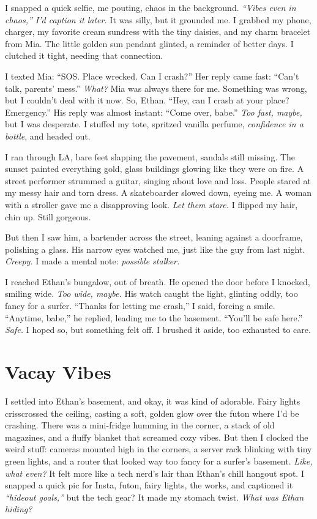 \documentclass[12pt]{article}
\begin{document}
{I snapped a quick selfie, me pouting, chaos in the background. \textit{“Vibes even in chaos,” I’d caption it later.} It was silly, but it grounded me. I grabbed my phone, charger, my favorite cream sundress with the tiny daisies, and my charm bracelet from \textnormal{Mia}. The little golden sun pendant glinted, a reminder of better days. I clutched it tight, needing that connection.

I texted \textnormal{Mia}: “SOS. Place wrecked. Can I crash?” Her reply came fast: “Can’t talk, parents’ mess.” \textit{What?} \textnormal{Mia} was always there for me. Something was wrong, but I couldn’t deal with it now. So, \textnormal{Ethan}. “Hey, can I crash at your place? Emergency.” His reply was almost instant: “Come over, babe.” \textit{Too fast, maybe,} but I was desperate. I stuffed my tote, spritzed vanilla perfume, \textit{confidence in a bottle}, and headed out.

I ran through LA, bare feet slapping the pavement, sandals still missing. The sunset painted everything gold, glass buildings glowing like they were on fire. A street performer strummed a guitar, singing about love and loss. People stared at my messy hair and torn dress. A skateboarder slowed down, eyeing me. A woman with a stroller gave me a disapproving look. \textit{Let them stare.} I flipped my hair, chin up. Still gorgeous.

But then I saw him, a bartender across the street, leaning against a doorframe, polishing a glass. His narrow eyes watched me, just like the guy from last night. \textit{Creepy.} I made a mental note: \textit{possible stalker.}

I reached \textnormal{Ethan}’s bungalow, out of breath. He opened the door before I knocked, smiling wide. \textit{Too wide, maybe.} His watch caught the light, glinting oddly, too fancy for a surfer. “Thanks for letting me crash,” I said, forcing a smile. “Anytime, babe,” he replied, leading me to the basement. “You’ll be safe here.” \textit{Safe.} I hoped so, but something felt off. I brushed it aside, too exhausted to care.

\section{Vacay Vibes}

I settled into \textnormal{Ethan}’s basement, and okay, it was kind of adorable. Fairy lights crisscrossed the ceiling, casting a soft, golden glow over the futon where I’d be crashing. There was a mini-fridge humming in the corner, a stack of old magazines, and a fluffy blanket that screamed cozy vibes. But then I clocked the weird stuff: cameras mounted high in the corners, a server rack blinking with tiny green lights, and a router that looked way too fancy for a surfer’s basement. \textit{Like, what even?} It felt more like a tech nerd’s lair than \textnormal{Ethan}’s chill hangout spot. I snapped a quick pic for Insta, futon, fairy lights, the works, and captioned it \textit{“hideout goals,”} but the tech gear? It made my stomach twist. \textit{What was \textnormal{Ethan} hiding?}

}
\end{document}
